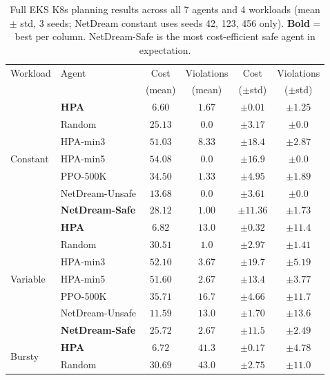 \begin{table}[H]
\centering
\small
\caption{Full EKS K8s planning results across all 7 agents and 4 workloads
(mean $\pm$ std, 3 seeds; NetDream constant uses seeds 42, 123, 456 only).
\textbf{Bold} = best per column.
NetDream-Safe is the most cost-efficient safe agent in expectation.}
\label{tab:full-k8s}
\setlength{\tabcolsep}{4pt}
\begin{tabular}{@{}llcccc@{}}
\toprule
Workload & Agent & Cost & Violations & Cost & Violations \\
         &       & (mean) & (mean) & ($\pm$std) & ($\pm$std) \\
\midrule
\multirow{7}{*}{Constant}
  & \textbf{HPA}             & $6.60$ & $1.67$ & $\pm0.01$ & $\pm1.25$ \\
  & Random                   & $25.13$ & $0.0$ & $\pm3.17$ & $\pm0.0$ \\
  & HPA-min3                 & $51.03$ & $8.33$ & $\pm18.4$ & $\pm2.87$ \\
  & HPA-min5                 & $54.08$ & $0.0$ & $\pm16.9$ & $\pm0.0$ \\
  & PPO-500K                 & $34.50$ & $1.33$ & $\pm4.95$ & $\pm1.89$ \\
  & NetDream-Unsafe          & $13.68$ & $0.0$ & $\pm3.61$ & $\pm0.0$ \\
  & \textbf{NetDream-Safe}   & $\mathbf{28.12}$ & $\mathbf{1.00}$ & $\pm11.36$ & $\pm1.73$ \\
\midrule
\multirow{7}{*}{Variable}
  & \textbf{HPA}             & $6.82$ & $13.0$ & $\pm0.32$ & $\pm11.4$ \\
  & Random                   & $30.51$ & $1.0$ & $\pm2.97$ & $\pm1.41$ \\
  & HPA-min3                 & $52.10$ & $3.67$ & $\pm19.7$ & $\pm5.19$ \\
  & HPA-min5                 & $51.60$ & $2.67$ & $\pm13.4$ & $\pm3.77$ \\
  & PPO-500K                 & $35.71$ & $16.7$ & $\pm4.66$ & $\pm11.7$ \\
  & NetDream-Unsafe          & $11.59$ & $13.0$ & $\pm1.70$ & $\pm13.6$ \\
  & \textbf{NetDream-Safe}   & $\mathbf{25.72}$ & $\mathbf{2.67}$ & $\pm11.5$ & $\pm2.49$ \\
\midrule
\multirow{7}{*}{Bursty}
  & \textbf{HPA}             & $6.72$ & $41.3$ & $\pm0.17$ & $\pm4.78$ \\
  & Random                   & $30.69$ & $43.0$ & $\pm2.75$ & $\pm11.0$ \\

\end{tabular}
\end{table}
